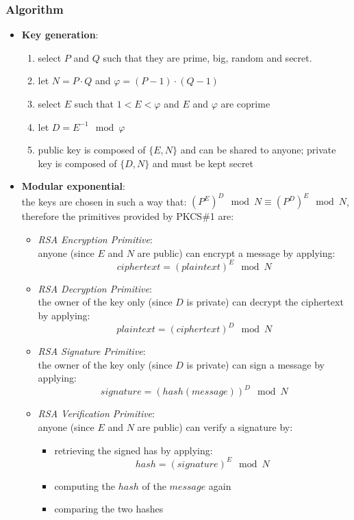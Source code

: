 \subsubsection{Algorithm}
\begin{itemize}
	\item \textbf{Key generation}:\\
		\begin{enumerate}
			\item select $P$ and $Q$ such that they are prime, big, random and secret.
			\item let $N = P \cdot Q$ and $\varphi = (P - 1) \cdot (Q - 1)$
			\item select $E$ such that $1 < E < \varphi$ and $E$ and $\varphi$ are coprime
			\item let $D = E^{-1} \mod \varphi$
			\item public key is composed of $\{E, N\}$ and can be shared to anyone;
				private key is composed of $\{D, N\}$ and must be kept secret
		\end{enumerate}
	\item \textbf{Modular exponential}:\\
		the keys are chosen in such a way that: $(P^E)^D \mod N \equiv (P^D)^E \mod
		N$, therefore the primitives provided by PKCS\#1 are:
		\begin{itemize}
			\item \emph{RSA Encryption Primitive}:\\
				anyone (since $E$ and $N$ are public) can encrypt a message by applying:
				\[ciphertext = (plaintext)^E \mod N\]
			\item \emph{RSA Decryption Primitive}:\\
				the owner of the key only (since $D$ is private) can decrypt the
				ciphertext by applying:
				\[plaintext = (ciphertext)^D \mod N\]
			\item \emph{RSA Signature Primitive}:\\
				the owner of the key only (since $D$ is private) can sign a message by
				applying:
				\[signature = (hash(message))^D \mod N\]
			\item \emph{RSA Verification Primitive}:\\
				anyone (since $E$ and $N$ are public) can verify a signature by:
				\begin{itemize}
					\item retrieving the signed has by applying:
						\[hash = (signature)^E \mod N\]
					\item computing the $hash$ of the $message$ again
					\item comparing the two hashes
				\end{itemize}
		\end{itemize}
\end{itemize}

